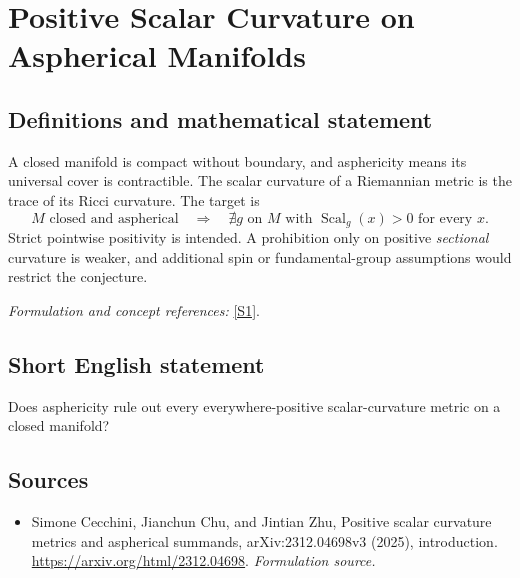\documentclass[11pt]{article}
\begin{document}
\section*{\texorpdfstring{Positive Scalar Curvature on Aspherical Manifolds}{Positive Scalar Curvature on Aspherical Manifolds}}\label{statement}
\subsection{Definitions and mathematical statement}
A closed manifold is compact without boundary, and asphericity means its universal cover is contractible. The scalar curvature of a Riemannian metric is the trace of its Ricci curvature. The target is
\[
 M\text{ closed and aspherical}\quad\Longrightarrow\quad
 \nexists g\text{ on }M\text{ with }\operatorname{Scal}_g(x)>0\text{ for every }x.
\]
Strict pointwise positivity is intended. A prohibition only on positive \emph{sectional} curvature is weaker, and additional spin or fundamental-group assumptions would restrict the conjecture.
\par\smallskip\textit{Formulation and concept references:} \href{https://arxiv.org/html/2312.04698}{[S1]}.

\subsection{Short English statement}
Does asphericity rule out every everywhere-positive scalar-curvature metric on a closed manifold?
\subsection{Sources}
\begin{itemize}
\item[S1]Simone Cecchini, Jianchun Chu, and Jintian Zhu, Positive scalar curvature metrics and aspherical summands, arXiv:2312.04698v3 (2025), introduction.
\url{https://arxiv.org/html/2312.04698}.
\textit{Formulation source.}
\end{itemize}
\end{document}
